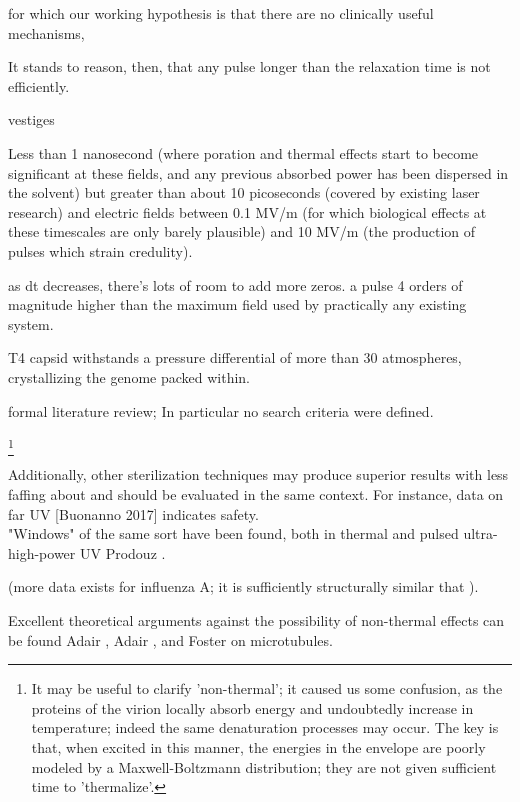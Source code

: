 \documentclass[paper.tex]{subfiles}
\begin{document}
\begin{multicols}{1}
for which our working hypothesis is that there are no clinically useful mechanisms, 



It stands to reason, then, that any pulse longer than the relaxation time is not efficiently. 

vestiges

Less than 1 nanosecond (where poration and thermal effects start to become significant at these fields, and any previous absorbed power has been dispersed in the solvent) but greater than about 10 picoseconds (covered by existing laser research) and electric fields between 0.1 MV/m (for which biological effects at these timescales are only barely plausible) and 10 MV/m (the production of pulses which strain credulity).

as dt decreases, there's lots of room to add more zeros. a pulse 4 orders of magnitude higher than the maximum field used by practically any existing system.





T4 capsid withstands a pressure differential of more than 30 atmospheres, crystallizing the genome packed within. \cite{Osmotic2003}


formal literature review; In particular no search criteria were defined.

%
\footnote{It may be useful to clarify 'non-thermal'; it caused us some confusion, as the proteins of the virion locally absorb energy and undoubtedly increase in temperature; indeed the same denaturation processes may occur. The key is that, when excited in this manner, the energies in the envelope are poorly modeled by a Maxwell-Boltzmann distribution; they are not given sufficient time to 'thermalize'.} 
%

Additionally, other sterilization techniques may produce superior results with less faffing about and should be evaluated in the same context. For instance, data on far UV [Buonanno 2017] indicates safety.\\



"Windows" of the same sort have been found, both in thermal and pulsed ultra-high-power UV Prodouz \cite{Use1987a}.


(more data exists for influenza A; it is sufficiently structurally similar that ).



Excellent theoretical arguments against the possibility of non-thermal effects can be found Adair \cite{Vibrational2002}, Adair \cite{Biological2002}, and Foster \cite{Viscous2000} on microtubules. 




\end{multicols}
\end{document}

